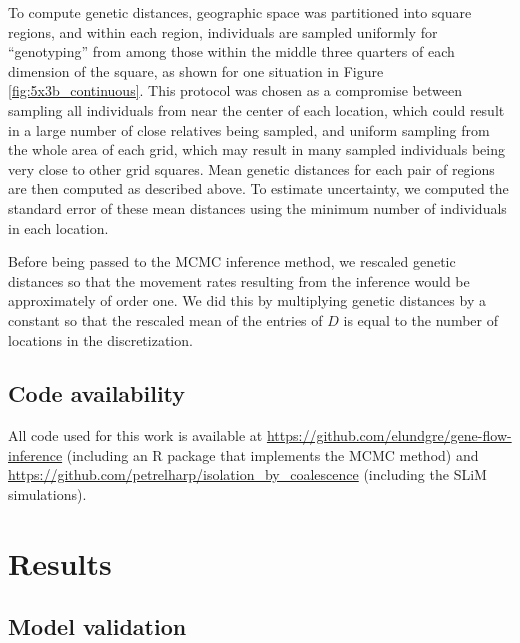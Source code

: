 \documentclass{article}
\begin{document}
To compute genetic distances,
geographic space was partitioned into square regions,
and within each region, 
individuals are sampled uniformly for ``genotyping'' 
from among those within the middle three quarters of each dimension of the square,
as shown for one situation in Figure \ref{fig:5x3b_continuous}.
This protocol was chosen as a compromise between sampling all individuals 
from near the center of each location,
which could result in a large number of close relatives being sampled,
and uniform sampling from the whole area of each grid, 
which may result in many sampled individuals being very close to other grid squares.
Mean genetic distances for each pair of regions are then computed as described above.
To estimate uncertainty, we computed the standard error of these mean distances
using the minimum number of individuals in each location.

Before being passed to the MCMC inference method,
we rescaled genetic distances so that the movement rates resulting from the inference
would be approximately of order one.
We did this by multiplying genetic distances by a constant
so that the rescaled mean of the entries of $D$
is equal to the number of locations in the discretization. 

\subsection*{Code availability}

All code used for this work is available at \url{https://github.com/elundgre/gene-flow-inference}
(including an R package that implements the MCMC method)
and \url{https://github.com/petrelharp/isolation_by_coalescence} (including the SLiM simulations).


\section*{Results}



\subsection*{Model validation}
\end{document}
